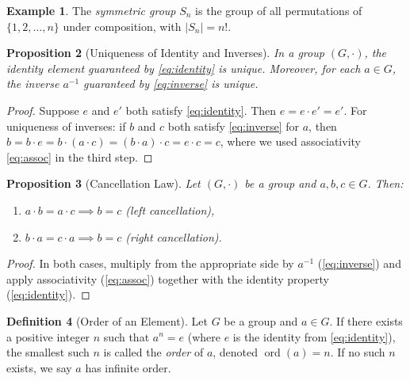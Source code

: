 \documentclass[12pt,a4paper]{article}
\theoremstyle{definition}
\newtheorem{definition}{Definition}[section]
\newtheorem{example}[definition]{Example}
\theoremstyle{plain}
\newtheorem{proposition}[definition]{Proposition}
\theoremstyle{remark}
\newcommand{\ord}{\operatorname{ord}}
\begin{document}
\begin{example}\label{ex:symmetric-group}
The \emph{symmetric group} $S_n$ is the group of all permutations
of $\{1, 2, \dots, n\}$ under composition, with $|S_n| = n!$.
\end{example}

\begin{proposition}[Uniqueness of Identity and Inverses]\label{prop:uniqueness}
In a group $(G, \cdot)$, the identity element guaranteed
by \cref{eq:identity} is unique. Moreover, for each $a \in G$, the inverse
$a^{-1}$ guaranteed by \cref{eq:inverse} is unique.
\end{proposition}

\begin{proof}
Suppose $e$ and $e'$ both satisfy \cref{eq:identity}. Then
$e = e \cdot e' = e'$.
For uniqueness of inverses: if $b$ and $c$ both satisfy \cref{eq:inverse} for $a$, then
$b = b \cdot e = b \cdot (a \cdot c) = (b \cdot a) \cdot c = e \cdot c = c$,
where we used associativity \cref{eq:assoc} in the third step.
\end{proof}

\begin{proposition}[Cancellation Law]\label{prop:cancellation}
Let $(G, \cdot)$ be a group and $a, b, c \in G$. Then:
\begin{enumerate}
    \item $a \cdot b = a \cdot c \implies b = c$ \quad (left cancellation),
    \item $b \cdot a = c \cdot a \implies b = c$ \quad (right cancellation).
\end{enumerate}
\end{proposition}

\begin{proof}
In both cases, multiply from the appropriate side by $a^{-1}$
(\cref{eq:inverse}) and apply associativity (\cref{eq:assoc})
together with the identity property (\cref{eq:identity}).
\end{proof}

\begin{definition}[Order of an Element]\label{def:order}
Let $G$ be a group and $a \in G$. If there exists a positive
integer $n$ such that $a^n = e$ (where $e$ is the identity from \cref{eq:identity}),
the smallest such $n$ is called the \emph{order} of $a$, denoted $\ord(a) = n$.
If no such $n$ exists, we say $a$ has infinite order.
\end{definition}
\end{document}
